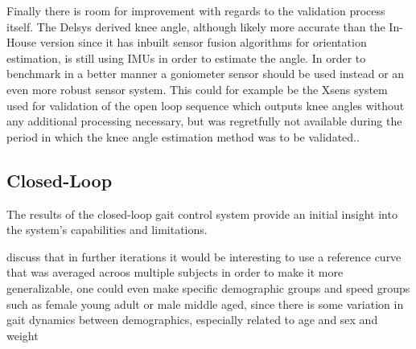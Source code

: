 Finally there is room for improvement with regards to the validation process itself. The Delsys derived knee angle, although likely more accurate than the In-House version since it has inbuilt sensor fusion algorithms for orientation estimation, is still using IMUs in order to estimate the angle. In order to benchmark in a better manner a goniometer sensor should be used instead or an even more robust sensor system. This could for example be the Xsens system used for validation of the open loop sequence which outputs knee angles without any additional processing necessary, but was regretfully not available during the period in which the knee angle estimation method was to be validated.. 

\subsection{Closed-Loop}

The results of the closed-loop gait control system provide an initial insight into the system's capabilities and limitations. 

discuss that in further iterations it would be interesting to use a reference curve that was averaged acroos multiple subjects in order to make it more generalizable, one could even make specific demographic groups and speed groups such as female young adult or male middle aged, since there is some variation in gait dynamics between demographics, especially related to age and sex and weight


